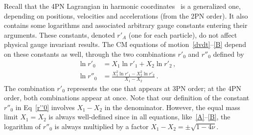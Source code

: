 \documentclass[prd,preprint,superscriptaddress,tightenlines,nofootinbib,
  eqsecnum,showpacs]{revtex4}
\begin{document}
Recall that the 4PN Lagrangian in harmonic coordinates~\cite{BBBFMa, BBBFMb}
is a generalized one, depending on positions, velocities and accelerations
(from the 2PN order). It also contains some logarithms and associated arbitrary gauge
constants entering their arguments. These constants, denoted $r'_A$ (one for
each particle), do not affect physical gauge invariant results. The CM
equations of motion~\eqref{dvdt}--\eqref{B} depend on these constants as well,
through the two combinations $r'_0$ and $r''_0$ defined by
%
\begin{subequations}\label{r'0r''0}
\begin{align}
\ln r'_0 &= X_1 \ln r'_1 + X_2 \ln r'_2\,,\\
\label{r''0} \ln r''_0 &= \frac{X_1^2 \ln r'_1 - X_2^2 \ln r'_2}{X_1-X_2}\,. 
\end{align} 
\end{subequations}
%
The combination $r'_0$ represents the one that appears at 3PN order; at the
4PN order, both combinations appear at once. Note that our definition of the constant $r''_0$ in Eq~\eqref{r''0} involves $X_{1}-X_{2}$ in the denominator. However, the equal mass limit $X_{1}=X_{2}$ is always well-defined since in all equations, like~\eqref{A}--\eqref{B}, the logarithm of $r''_0$ is always multiplied by a factor $X_{1}-X_{2}=\pm\sqrt{1-4\nu}$.
\end{document}
